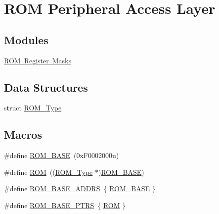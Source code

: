 \hypertarget{group___r_o_m___peripheral___access___layer}{}\section{R\+OM Peripheral Access Layer}
\label{group___r_o_m___peripheral___access___layer}
\subsection*{Modules}
\begin{DoxyCompactItemize}
\item 
\mbox{\hyperlink{group___r_o_m___register___masks}{R\+O\+M Register Masks}}
\end{DoxyCompactItemize}
\subsection*{Data Structures}
\begin{DoxyCompactItemize}
\item 
struct \mbox{\hyperlink{struct_r_o_m___type}{R\+O\+M\+\_\+\+Type}}
\end{DoxyCompactItemize}
\subsection*{Macros}
\begin{DoxyCompactItemize}
\item 
\#define \mbox{\hyperlink{group___r_o_m___peripheral___access___layer_ga8a652cff0033969443cc2f6f5389fbd9}{R\+O\+M\+\_\+\+B\+A\+SE}}~(0x\+F0002000u)
\item 
\#define \mbox{\hyperlink{group___r_o_m___peripheral___access___layer_ga408c4c066164afa1b6aa3f804c3d3528}{R\+OM}}~((\mbox{\hyperlink{struct_r_o_m___type}{R\+O\+M\+\_\+\+Type}} $\ast$)\mbox{\hyperlink{group___r_o_m___peripheral___access___layer_ga8a652cff0033969443cc2f6f5389fbd9}{R\+O\+M\+\_\+\+B\+A\+SE}})
\item 
\#define \mbox{\hyperlink{group___r_o_m___peripheral___access___layer_ga0eb4d11bf6d7e33f197e6e423e41409f}{R\+O\+M\+\_\+\+B\+A\+S\+E\+\_\+\+A\+D\+D\+RS}}~\{ \mbox{\hyperlink{group___r_o_m___peripheral___access___layer_ga8a652cff0033969443cc2f6f5389fbd9}{R\+O\+M\+\_\+\+B\+A\+SE}} \}
\item 
\#define \mbox{\hyperlink{group___r_o_m___peripheral___access___layer_ga41e000a3e59f16dd8f395cebcb883e82}{R\+O\+M\+\_\+\+B\+A\+S\+E\+\_\+\+P\+T\+RS}}~\{ \mbox{\hyperlink{group___r_o_m___peripheral___access___layer_ga408c4c066164afa1b6aa3f804c3d3528}{R\+OM}} \}
\end{DoxyCompactItemize}



